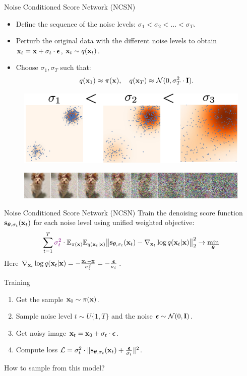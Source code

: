 \begin{frame}{Noise Conditioned Score Network (NCSN)}
	\begin{itemize}
		\item Define the sequence of the noise levels: $\sigma_1 < \sigma_2 < \dots < \sigma_T$.
		\item Perturb the original data with the different noise levels to obtain $\mathbf{x}_t = \mathbf{x} + \sigma_t \cdot \boldsymbol{\epsilon}$, $\mathbf{x}_t \sim q(\mathbf{x}_t)$. 
		\item Choose $\sigma_1, \sigma_T$ such that:
		\[
			q(\mathbf{x}_1) \approx \pi(\mathbf{x}), \quad q(\mathbf{x}_T) \approx \mathcal{N}(0, \sigma_T^2 \cdot \mathbf{I}).
		\]
	\end{itemize}
	\begin{figure}
		\includegraphics[width=0.6\linewidth]{figs/multi_scale}
	\end{figure}
	\begin{figure}
		\includegraphics[width=\linewidth]{figs/duoduo}
	\end{figure}
\end{frame}
\begin{frame}{Noise Conditioned Score Network (NCSN)}
	Train the denoising score function $\mathbf{s}_{\boldsymbol{\theta}, \sigma_t}(\mathbf{x}_t)$ for each noise level using unified weighted objective:
	\vspace{-0.2cm}
	\[
		\sum_{t=1}^T {\color{violet}\sigma_t^2} \cdot \mathbb{E}_{\pi(\mathbf{x})} \mathbb{E}_{q(\mathbf{x}_t | \mathbf{x})}\bigl\| \mathbf{s}_{\boldsymbol{\theta}, \sigma_t}(\mathbf{x}_t) - \nabla_{\mathbf{x}_t} \log q(\mathbf{x}_t | \mathbf{x}) \bigr\|^2_2 \rightarrow \min_{\boldsymbol{\theta}}
	\]
	Here $\nabla_{\mathbf{x}_t} \log q(\mathbf{x}_t | \mathbf{x}) = - \frac{\mathbf{x}_t - \mathbf{x}}{\sigma_t^2} = - \frac{\boldsymbol{\epsilon}}{\sigma_t}$.
	\begin{block}{Training}
		\begin{enumerate}
			\item Get the sample $\mathbf{x}_0 \sim \pi(\mathbf{x})$.
			\item Sample noise level $t \sim U\{1, T\}$ and the noise $\boldsymbol{\epsilon} \sim \mathcal{N}(0, \mathbf{I})$.
			\item Get noisy image $\mathbf{x}_t = \mathbf{x}_0 + \sigma_t \cdot \boldsymbol{\epsilon}$.
			\item Compute loss $ \mathcal{L} = \sigma_t^2 \cdot \| \mathbf{s}_{\boldsymbol{\theta}, \sigma_t}(\mathbf{x}_t) + \frac{\boldsymbol{\epsilon}}{\sigma_t} \|^2 $.
		\end{enumerate}
	\end{block}
	How to sample from this model?
\end{frame}
